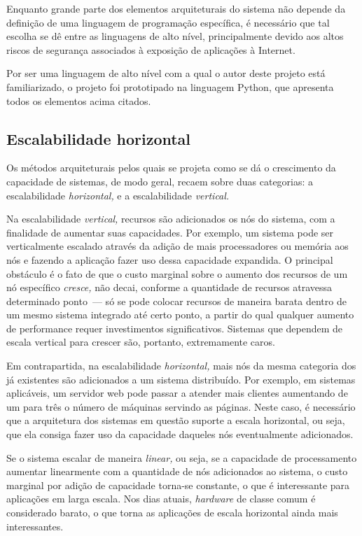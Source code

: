 \documentclass[ruledheader, 12pt]{abnt}
\begin{document}
Enquanto grande parte dos elementos arquiteturais do sistema não depende da definição de uma linguagem de programação específica, é necessário que tal escolha se dê entre as linguagens de alto nível, principalmente devido aos altos riscos de segurança associados à exposição de aplicações à Internet.

Por ser uma linguagem de alto nível com a qual o autor deste projeto está familiarizado, o projeto foi prototipado na linguagem Python, que apresenta todos os elementos acima citados.

\subsection{Escalabilidade horizontal}

Os métodos arquiteturais pelos quais se projeta como se dá o crescimento da capacidade de sistemas, de modo geral, recaem sobre duas categorias: a escalabilidade \emph{horizontal,} e a escalabilidade \emph{vertical.}

Na escalabilidade \emph{vertical,} recursos são adicionados os nós do sistema, com a finalidade de aumentar suas capacidades. Por exemplo, um sistema pode ser verticalmente escalado através da adição de mais processadores ou memória aos nós e fazendo a aplicação fazer uso dessa capacidade expandida. O principal obstáculo é o fato de que o custo marginal sobre o aumento dos recursos de um nó específico \emph{cresce,} não decai, conforme a quantidade de recursos atravessa determinado ponto~--- só se pode colocar recursos de maneira barata dentro de um mesmo sistema integrado até certo ponto, a partir do qual qualquer aumento de performance requer investimentos significativos. Sistemas que dependem de escala vertical para crescer são, portanto, extremamente caros.

Em contrapartida, na escalabilidade \emph{horizontal,} mais nós da mesma categoria dos já existentes são adicionados a um sistema distribuído. Por exemplo, em sistemas aplicáveis, um servidor web pode passar a atender mais clientes aumentando de um para três o número de máquinas servindo as páginas. Neste caso, é necessário que a arquitetura dos sistemas em questão suporte a escala horizontal, ou seja, que ela consiga fazer uso da capacidade daqueles nós eventualmente adicionados.

Se o sistema escalar de maneira \emph{linear,} ou seja, se a capacidade de processamento aumentar linearmente com a quantidade de nós adicionados ao sistema, o custo marginal por adição de capacidade torna-se constante, o que é interessante para aplicações em larga escala. Nos dias atuais, \emph{hardware} de classe comum é considerado barato, o que torna as aplicações de escala horizontal ainda mais interessantes.
\end{document}
